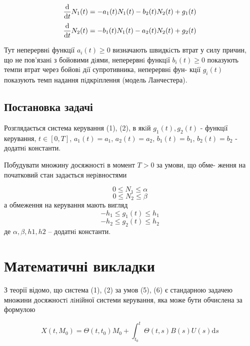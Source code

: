 \documentclass[fontsize=14pt,DIV=1,a4paper]{scrartcl}
\begin{document}
\begin{equation}
{\frac {\rm d}{{\rm d}t}}N_1(t) = -a_1(t) N_1(t) - b_2(t) N_2(t) + g_1(t)
\end{equation}
\begin{equation}
{\frac {\rm d}{{\rm d}t}}N_2(t) = -b_1(t) N_1(t) - a_2(t) N_2(t) + g_2(t)
\end{equation}

Тут неперервнi функцiї $a_i(t) \geq  0$ визначають швидкiсть втрат у силу
причин, що не пов’язанi з бойовими дiями, неперервнi функцiї $b_i(t) \geq  0$
показують темпи втрат через бойовi дiї супротивника, неперервнi фун-
кцiї $g_i(t)$ показують темп надання пiдкрiплення (модель Ланчестера).

\subsection{Постановка задачі}
Розглядається система керування (1), (2), в якiй $g_1 (t), g_2(t)$ - функцiї керування,
$t \in [0, T]$, $a_1 (t) = a_1$, $a_2(t) = a_2$, $b_1 (t) = b_1$, $b_2 (t) = b_2$ - додатнi константи.

Побудувати множину досяжностi в момент $T > 0$ за умови, що обме-
ження на початковий стан задається нерiвностями

\begin{equation}
0\leq N_1\leq \alpha 
\end{equation}
\begin{equation}
0\leq N_2\leq \beta
\end{equation}
а обмеження на керування мають вигляд
\begin{equation}
-h_1\leq g_1(t)\leq h_1
\end{equation}
\begin{equation}
-h_2\leq g_2(t)\leq h_2
\end{equation}
де $\alpha, \beta, h1, h2$ – додатнi константи.
\section{Математичні викладки}

З теорії відомо, що система (1), (2) за умов (5), (6) є стандарною задачею множини досяжностi лiнiйної системи керування, яка може бути обчислена за формулою

\begin{equation}
X(t, M_0) = \Theta (t, t_0) M_0 +\int_{t_0}^t \Theta (t, s) B(s)U(s)\mathrm{d}s
\end{equation}
 
\end{document}
